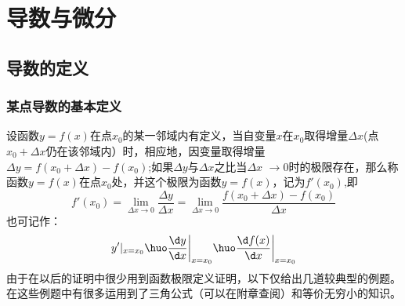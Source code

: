 
\chapter{导数与微分}
\section{导数的定义}
\subsection{某点导数的基本定义}
\tdefination[导数定义1]
设函数$y=f(x)$在点$x_{0}$的某一邻域内有定义，当自变量$x$在$x_{0}$取得增量$\Delta x$(点$x_0+\Delta x$仍在该邻域内）时，相应地，因变量取得增量$\Delta y=f(x_0+\Delta x)-f(x_0)$;如果$\Delta y$与$\Delta x$之比当$\Delta x$ $\to$0时的极限存在，那么称函数$y=f(x)$在点$x_0$处，并这个极限为函数$y=f(x)$，记为$f'(x_0)$,即
\begin{equation}
	f'(x_0)=\lim\limits_{\Delta x\to 0}\frac{\Delta y}{\Delta x}=\lim\limits_{\Delta x\to 0}\frac{f(x_0+\Delta x)-f(x_0)}{\Delta x}
\end{equation}
也可记作：
\begin{equation}
	y'|_{x=x_0} \huo \frac{\d y}{\d x}\bigg|_{x=x_0}\huo \frac{\d f(x)}{\d x}\bigg|_{x=x_0}
\end{equation}
\kg 由于在以后的证明中很少用到函数极限定义证明，以下仅给出几道较典型的例题。\\
\kg 在这些例题中有很多运用到了三角公式（可以在附章查阅）和等价无穷小的知识。\\ 

